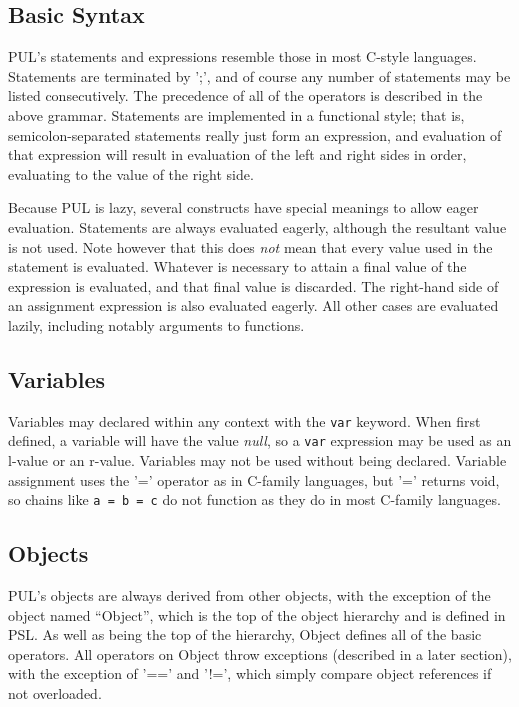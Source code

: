 \subsection{Basic Syntax}

PUL's statements and expressions resemble those in most C-style languages. Statements are terminated by ';', and of course any number of statements may be listed consecutively. The precedence of all of the operators is described in the above grammar. Statements are implemented in a functional style; that is, semicolon-separated statements really just form an expression, and evaluation of that expression will result in evaluation of the left and right sides in order, evaluating to the value of the right side.

Because PUL is lazy, several constructs have special meanings to allow eager evaluation. Statements are always evaluated eagerly, although the resultant value is not used. Note however that this does \textit{not} mean that every value used in the statement is evaluated. Whatever is necessary to attain a final value of the expression is evaluated, and that final value is discarded. The right-hand side of an assignment expression is also evaluated eagerly. All other cases are evaluated lazily, including notably arguments to functions.



\subsection{Variables}

Variables may declared within any context with the \texttt{var} keyword. When first defined, a variable will have the value \textit{null}, so a \texttt{var} expression may be used as an l-value or an r-value. Variables may not be used without being declared. Variable assignment uses the '=' operator as in C-family languages, but '=' returns void, so chains like \texttt{a = b = c} do not function as they do in most C-family languages.



\subsection{Objects}

PUL's objects are always derived from other objects, with the exception of the object named “Object”, which is the top of the object hierarchy and is defined in PSL. As well as being the top of the hierarchy, Object defines all of the basic operators. All operators on Object throw exceptions (described in a later section), with the exception of '==' and '!=', which simply compare object references if not overloaded.



